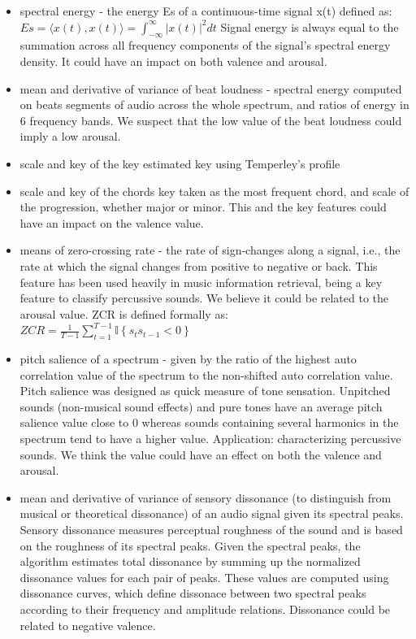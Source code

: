 \begin{itemize}
\item spectral energy - the energy E{s} of a continuous-time signal x(t) defined as: \\
$ E{s}  =  \langle x(t), x(t)\rangle =  \int_{-\infty}^{\infty}{|x(t)|^2}dt $
Signal energy is always equal to the summation across all frequency components of the signal's spectral energy density. It could have an impact on both valence and arousal.

\item mean and derivative of variance of beat loudness -  spectral energy computed on beats segments of audio across the whole spectrum, and ratios of energy in 6 frequency bands. We suspect that the low value of the beat loudness could imply a low arousal.

\item scale and key of the key estimated key using Temperley’s profile

\item scale and key of the chords key taken as the most frequent chord, and scale of the progression, whether major or minor. This and the key features could have an impact on the valence value.

\item means of zero-crossing rate - the rate of sign-changes along a signal, i.e., the rate at which the signal changes from positive to negative or back. This feature has been used heavily in music information retrieval, being a key feature to classify percussive sounds. We believe it could be related to the arousal value.
ZCR is defined formally as: \\
$ZCR = \frac{1}{T-1} \sum_{t=1}^{T-1} {{\mathbb I}\left\{{s_t s_{t-1} < 0}\right\}}$

\item pitch salience of a spectrum - given by the ratio of the highest auto correlation value of the spectrum to the non-shifted auto correlation value. Pitch salience was designed as quick measure of tone sensation. Unpitched sounds (non-musical sound effects) and pure tones have an average pitch salience value close to 0 whereas sounds containing several harmonics in the spectrum tend to have a higher value. Application: characterizing percussive sounds. We think the value could have an effect on both the valence and arousal.

\item mean and derivative of variance of sensory dissonance (to distinguish from musical or theoretical dissonance) of an audio signal given its spectral peaks. Sensory dissonance measures perceptual roughness of the sound and is based on the roughness of its spectral peaks. Given the spectral peaks, the algorithm estimates total dissonance by summing up the normalized dissonance values for each pair of peaks. These values are computed using dissonance curves, which define dissonace between two spectral peaks according to their frequency and amplitude relations. Dissonance could be related to negative valence.

\end{itemize}

